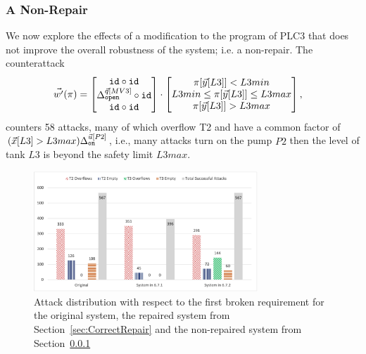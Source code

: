{\subsubsection{A Non-Repair} 
\label{sec:NonRepair} We now explore the effects of a modification to the program of PLC3 that does not improve the overall robustness of the system; i.e. a non-repair. The counterattack 
\begin{align*}
    \vec{w'}(\pi)&=
    \begin{bmatrix}
     {\texttt{id}}\circ {\texttt{id}} \\
     {\Delta}^{\vec{q}[MV3]}_{\texttt{open}}\circ {\texttt{id}} \\
     {\texttt{id}}\circ {\texttt{id}} \\
    \end{bmatrix}
    \cdot
    \begin{bmatrix}
      \pi[\vec{y}[L3]]<L3min \\
      L3min \leq \pi[\vec{y}[L3]]\leq L3max \\
      \pi[\vec{y}[L3]]>L3max
    \end{bmatrix},
  \end{align*} 
counters 58 attacks, many of which overflow T2 and have a common factor of $(\vec{x}[L3]>L3max){\Delta}^{\vec{u}[P2]}_{\texttt{on}}$, i.e., many attacks turn on the pump $P2$ then the level of tank $L3$ is beyond the safety limit $L3max$. 
\begin{figure}[t]
  \includegraphics[width=0.75\textwidth]{Figures/AttackDistribution.png} 
  \caption{Attack distribution with respect to the first broken requirement for the original system, the repaired system from Section~\ref{sec:CorrectRepair} and the non-repaired system from Section~\ref{sec:NonRepair}}

\end{figure}}
